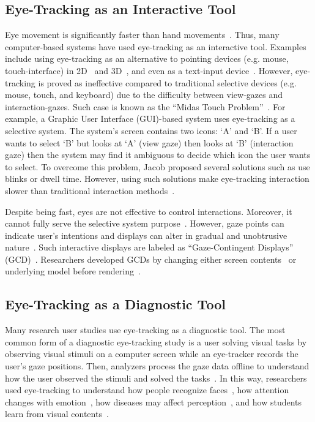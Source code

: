 \subsection{Eye-Tracking as an Interactive Tool}
\label{sec:EyeTrackingInteractive}
Eye movement is significantly faster than hand movements~\cite{sibert2000evaluation}. Thus, many computer-based systems have used eye-tracking as an interactive tool. Examples include using eye-tracking as an alternative to pointing devices (e.g. mouse, touch-interface) in 2D~\cite{Jacob91} and 3D~\cite{Bolt90, Tan00}, and even as a text-input device~\cite{Maj02}. However, eye-tracking is proved as ineffective compared to traditional selective devices (e.g. mouse, touch, and keyboard) due to the difficulty between view-gazes and interaction-gazes. Such case is known as the ``Midas Touch Problem''~\cite{Jacob91}. For example, a Graphic User Interface (GUI)-based system uses eye-tracking as a selective system. The system's screen contains two icons: `A' and `B'. If a user wants to select `B' but looks at `A' (view gaze) then looks at `B' (interaction gaze) then the system may find it ambiguous to decide which icon the user wants to select. To overcome this problem, Jacob proposed several solutions such as use blinks or dwell time. However, using such solutions make eye-tracking interaction slower than traditional interaction methods~\cite{Jacob91}. 

Despite being fast, eyes are not effective to control interactions. Moreover, it cannot fully serve the selective system purpose~\cite{Zha99}. However, gaze points can indicate user's intentions and displays can alter in gradual and unobtrusive nature~\cite{Jacob91, Jacob03}. Such interactive displays are labeled as ``Gaze-Contingent Displays'' (GCD)~\cite{Duch07}.  Researchers developed GCDs by changing either screen contents~\cite{Rein03, PN02} or underlying model before rendering~\cite{Dan00, OD01, ODH02, Okoe14}. 

\subsection{Eye-Tracking as a Diagnostic Tool}
\label{sec:EyeTrackingDiagnostic}
Many research user studies use eye-tracking as a diagnostic tool. The most common form of a diagnostic eye-tracking study is a user solving visual tasks by observing visual stimuli on a computer screen while an eye-tracker records the user's gaze positions. Then, analyzers process the gaze data offline to understand how the user observed the stimuli and solved the tasks~\cite{Duch07}. In this way, researchers used eye-tracking to understand how people recognize faces~\cite{Guo14, Sha14}, how attention changes with emotion~\cite{Ver13}, how diseases may affect perception~\cite{Kim14}, and how students learn from visual contents~\cite{Zaw15, May10, vGo10, Con13}.

